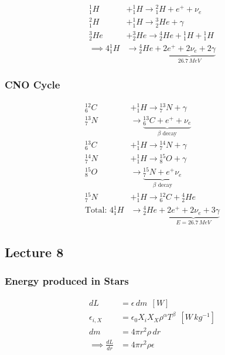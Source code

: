 \documentclass[a4paper,11pt,normalem]{article}
\begin{document}
\[
    \begin{aligned}
    {}^{1}_{1}H &+ {}^{1}_{1}H \to {}^{2}_{1}H + e^+ + \nu_e \\
    {}^{2}_{1}H &+ {}^{1}_{1}H \to {}^{3}_{2}He + \gamma \\
    {}^{3}_{2}He &+ {}^{3}_{2}He \to {}^{4}_{2}He + {}^{1}_{1}H + {}^{1}_{1}H \\
    \implies 4{}^{1}_{1}H &\to {}^{4}_{2}He + \underbrace{2e^+ + 2\nu_e + 2\gamma}_{26.7\,MeV}
    \end{aligned}
\]

\subsubsection{CNO Cycle}\label{cno-cycle}

\[
    \begin{aligned}
    {}^{12}_{6}C &+ {}^{1}_{1}H \to {}^{13}_{7}N + \gamma \\
    {}^{13}_{7}N  &\to \underbrace{{}^{13}_{6}C + e^+ + \nu_e}_{\beta\text{ decay}} \\
    {}^{13}_{6}C &+ {}^{1}_{1}H \to {}^{14}_{7}N + \gamma \\
    {}^{14}_{7}N &+ {}^{1}_{1}H \to {}^{15}_{8}O + \gamma \\
    {}^{15}_{8}O &\to \underbrace{{}^{15}_{7}N + e^+ \nu_e}_{\beta\text{ decay}} \\
    {}^{15}_{7}N &+ {}^{1}_{1}H \to {}^{12}_{6}C + {}^{4}_{2}He \\
    \text{Total: }4{}^{1}_{1}H &\to {}^{4}_{2}He + \underbrace{2e^+ + 2\nu_e + 3\gamma}_{E = 26.7\,MeV}
    \end{aligned}
\]

\subsection{Lecture 8}\label{lecture-8}

\subsubsection{Energy produced in Stars}\label{energy-produced-in-stars}

\[
    \begin{aligned}
    dL &= \epsilon\,dm ~~ [W] \\
    \epsilon_{i,X} &= \epsilon_0 X_i X_X \rho^\alpha T^\beta ~~ [W\,kg^{-1}] \\
    dm &= 4\pi r^2\rho\,dr \\
    \implies \frac{dL}{dr} &= 4\pi r^2 \rho \epsilon
    \end{aligned}
\]
\end{document}
